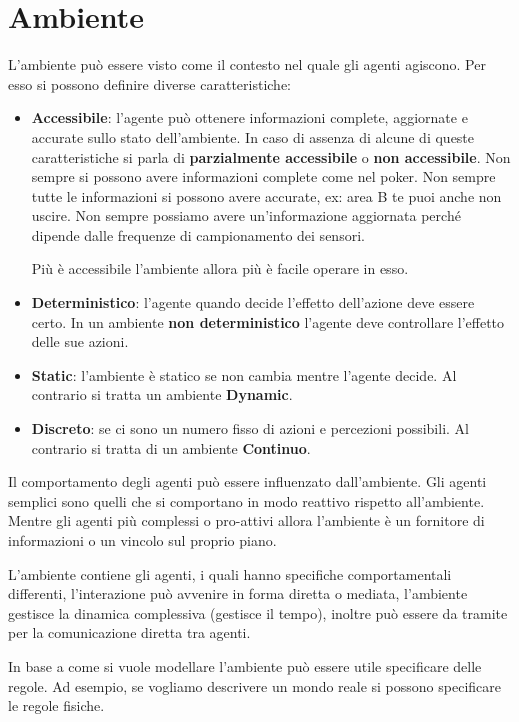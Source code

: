 \section{Ambiente}
L'ambiente può essere visto come il contesto nel quale gli agenti agiscono. Per
esso si possono definire diverse caratteristiche:
\begin{itemize}
    \item \textbf{Accessibile}: l'agente può ottenere informazioni complete,
          aggiornate e accurate sullo stato dell'ambiente. In caso di assenza di
          alcune di queste caratteristiche si parla di \textbf{parzialmente
              accessibile} o \textbf{non accessibile}.
          Non sempre si possono avere informazioni complete come nel poker.
          Non sempre tutte le informazioni si possono avere accurate, ex: area
          B te puoi anche non uscire. Non sempre possiamo avere un'informazione
          aggiornata perché dipende dalle frequenze di campionamento dei sensori.

          Più è accessibile l'ambiente allora più è facile operare in esso.
    \item \textbf{Deterministico}: l'agente quando decide l'effetto dell'azione
          deve essere certo. In un ambiente \textbf{non deterministico}
          l'agente deve controllare l'effetto delle sue azioni.
    \item \textbf{Static}: l'ambiente è statico se non cambia mentre
          l'agente decide. Al contrario si tratta un ambiente \textbf{Dynamic}.
    \item \textbf{Discreto}: se ci sono un numero fisso di azioni e percezioni
          possibili. Al contrario si tratta di un ambiente \textbf{Continuo}.
\end{itemize}

Il comportamento degli agenti può essere influenzato dall'ambiente. Gli agenti
semplici sono quelli che si comportano in modo reattivo rispetto all'ambiente.
Mentre gli agenti più complessi o pro-attivi allora l'ambiente è un fornitore di
informazioni o un vincolo sul proprio piano.

L'ambiente contiene gli agenti, i quali hanno specifiche comportamentali
differenti, l'interazione può avvenire in forma diretta o mediata, l'ambiente
gestisce la dinamica complessiva (gestisce il tempo), inoltre può essere da
tramite per la comunicazione diretta tra agenti.

In base a come si vuole modellare l'ambiente può essere utile specificare delle
regole. Ad esempio, se vogliamo descrivere un mondo reale si possono specificare
le regole fisiche.

